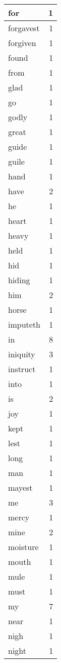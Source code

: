 \begin{center}
\begin{longtable}{l|r}
for & 1 \\ \hline
forgavest & 1 \\ \hline
forgiven & 1 \\ \hline
found & 1 \\ \hline
from & 1 \\ \hline
glad & 1 \\ \hline
go & 1 \\ \hline
godly & 1 \\ \hline
great & 1 \\ \hline
guide & 1 \\ \hline
guile & 1 \\ \hline
hand & 1 \\ \hline
have & 2 \\ \hline
he & 1 \\ \hline
heart & 1 \\ \hline
heavy & 1 \\ \hline
held & 1 \\ \hline
hid & 1 \\ \hline
hiding & 1 \\ \hline
him & 2 \\ \hline
horse & 1 \\ \hline
imputeth & 1 \\ \hline
in & 8 \\ \hline
iniquity & 3 \\ \hline
instruct & 1 \\ \hline
into & 1 \\ \hline
is & 2 \\ \hline
joy & 1 \\ \hline
kept & 1 \\ \hline
lest & 1 \\ \hline
long & 1 \\ \hline
man & 1 \\ \hline
mayest & 1 \\ \hline
me & 3 \\ \hline
mercy & 1 \\ \hline
mine & 2 \\ \hline
moisture & 1 \\ \hline
mouth & 1 \\ \hline
mule & 1 \\ \hline
must & 1 \\ \hline
my & 7 \\ \hline
near & 1 \\ \hline
nigh & 1 \\ \hline
night & 1 \\ \hline

\end{longtable}
\end{center}
